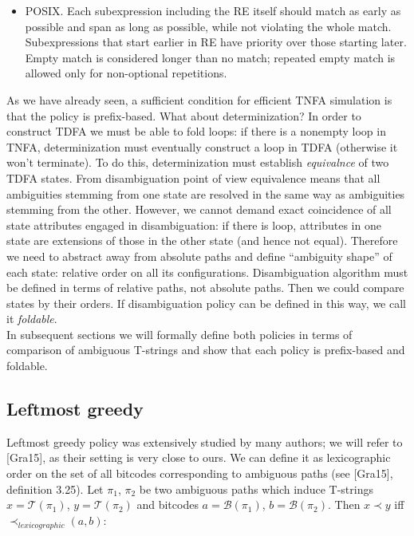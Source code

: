 \documentclass{article}
\newcommand{\Xeq}{\!=\!}
\newcommand{\XB}{\mathcal{B}}
\newcommand{\XT}{\mathcal{T}}
\theoremstyle{definition}
\begin{document}
\begin{multicols}{2}
\begin{itemize}
    \item POSIX.
        Each subexpression including the RE itself should match as early as possible
        and span as long as possible, while not violating the whole match.
        Subexpressions that start earlier in RE have priority over those starting later.
        Empty match is considered longer than no match;
        repeated empty match is allowed only for non-optional repetitions.
    \\
\end{itemize}

As we have already seen, a sufficient condition for efficient TNFA simulation is that the policy is prefix-based.
What about determinization?
In order to construct TDFA we must be able to fold loops:
if there is a nonempty loop in TNFA, determinization must eventually construct a loop in TDFA
(otherwise it won't terminate).
To do this, determinization must establish \emph{equivalnce} of two TDFA states.
From disambiguation point of view equivalence means that all ambiguities stemming from one state
are resolved in the same way as ambiguities stemming from the other.
However, we cannot demand exact coincidence of all state attributes engaged in disambiguation:
if there is loop, attributes in one state are extensions of those in the other state (and hence not equal).
Therefore we need to abstract away from absolute paths and define ``ambiguity shape'' of each state: relative order on all its configurations.
Disambiguation algorithm must be defined in terms of relative paths, not absolute paths.
Then we could compare states by their orders.
If disambiguation policy can be defined in this way, we call it \emph{foldable}.
\\

In subsequent sections we will formally define both policies in terms of comparison of ambiguous T-strings
and show that each policy is prefix-based and foldable.

\subsection*{Leftmost greedy}

Leftmost greedy policy was extensively studied by many authors; we will refer to [Gra15], as their setting is very close to ours.
We can define it as lexicographic order on the set of all bitcodes corresponding to ambiguous paths
(see [Gra15], definition 3.25).
Let $\pi_1$, $\pi_2$ be two ambiguous paths which induce T-strings $x \Xeq \XT(\pi_1)$, $y \Xeq \XT(\pi_2)$
and bitcodes $a \Xeq \XB(\pi_1)$, $b \Xeq \XB(\pi_2)$.
Then $x \prec y$ iff $\prec_{lexicographic} (a, b)$:
\\


\end{multicols}
\end{document}
